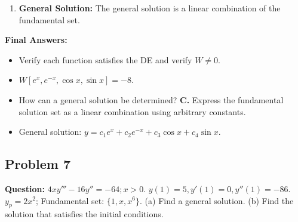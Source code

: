 \documentclass[11pt, a4paper]{article}
\theoremstyle{definition}
\theoremstyle{remark}
\begin{document}
\begin{enumerate}
    \[ W = \begin{vmatrix} 2e^x & 2e^{-x} \\ 2e^x & -2e^{-x} \end{vmatrix} \cdot \begin{vmatrix} -\cos x & -\sin x \\ \sin x & -\cos x \end{vmatrix} \]
    Calculate the first block:
    \[ (2e^x)(-2e^{-x}) - (2e^{-x})(2e^x) = -4 - 4 = -8 \]
    Calculate the second block:
    \[ (-\cos x)(-\cos x) - (-\sin x)(\sin x) = \cos^2 x + \sin^2 x = 1 \]
    Multiply them together: $W = -8 \cdot 1 = -8$.
    Since $W \neq 0$, the functions form a fundamental solution set.
    \item \textbf{General Solution:} The general solution is a linear combination of the fundamental set.
\end{enumerate}
\textbf{Final Answers:}
\begin{itemize}
    \item Verify each function satisfies the DE and verify $W \neq 0$.
    \item $W[e^x, e^{-x}, \cos x, \sin x] = -8$.
    \item How can a general solution be determined? \textbf{C.} Express the fundamental solution set as a linear combination using arbitrary constants.
    \item General solution: $y = c_1 e^x + c_2 e^{-x} + c_3 \cos x + c_4 \sin x$.
\end{itemize}

\vspace{1em}
\subsection{Problem 7}
\textbf{Question:} $4xy''' - 16y'' = -64; x>0$. $y(1)=5, y'(1)=0, y''(1)=-86$. $y_p = 2x^2$; Fundamental set: $\{1, x, x^6\}$.
(a) Find a general solution. (b) Find the solution that satisfies the initial conditions.
\end{document}

